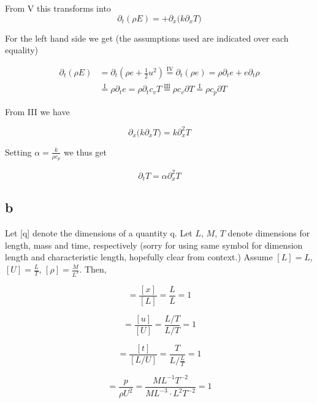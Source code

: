 \documentclass{article}
\begin{document}
From V this transforms into
\begin{equation}
	\partial_t (\rho E) = + \partial_x{(k\partial_x{T}})
\end{equation}

For the left hand side we get (the assumptions used are indicated over each equality)

\begin{align}
	\partial_t(\rho E) &= \partial_t (\rho e + \frac{1}{2}u^2) \overset{\text{IV}}{=} \partial_t(\rho e) = \rho \partial_t e + e \partial_t \rho \\
&\overset{\text{I}}{=}  \rho \partial_t e = \rho \partial_t c_v T \overset{\text{III}}{=} \rho c_v \partial T \overset{\text{I}}{=} \rho c_p \partial T
\end{align}

From III we have

\begin{equation}
	\partial_x{(k\partial_x{T}}) = k \partial_x^2 T
\end{equation}

Setting $\alpha = \frac{k}{\rho c_p}$ we thus get

\begin{equation}
	\partial_t T = \alpha \partial_x^2 T
\end{equation}



\subsection*{b}
Let [q] denote the dimensions of a quantity q. Let $L$, $M$, $T$ denote dimensions for length, mass and time, respectively (sorry for using same symbol for dimension length and characteristic length, hopefully clear from context.) Assume $[L] = L$, $[U] = \frac{L}{T}$, $[\rho] = \frac{M}{L^3}$. Then,

\begin{equation}
[\vec{x}^*] = \frac{[x]}{[L]} = \frac{L}{L} = 1
\end{equation}

\begin{equation}
[\vec{u}*] = \frac{[u]}{[U]} = \frac{L/T}{L/T} = 1 
\end{equation}

\begin{equation}
[t^*] = \frac{[t]}{[L/U]} = \frac{T}{ L / \frac{L}{T} } = 1
\end{equation}

\begin{equation}
[p^*] = \frac{p}{\rho U^2} = \frac{M L^{-1} T^{-2}}{M L^{-3} \cdot L^2T^{-2}} = 1
\end{equation}
\end{document}
